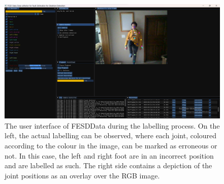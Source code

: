 \begin{figure}
  \centering
  \includegraphics[width=.8\textwidth]{figures/FESDData/labelling.png}
  \caption[FESDData user interface for data labelling]{The user interface of FESDData during the labelling process. On the left, the actual labelling can be observed, where each joint, coloured according to the colour in the image, can be marked as erroneous or not. In this case, the left and right foot are in an incorrect position and are labelled as such. The right side contains a depiction of the joint positions as an overlay over the RGB image.}
  \label{fig:fesddata_labelling}
\end{figure}  
